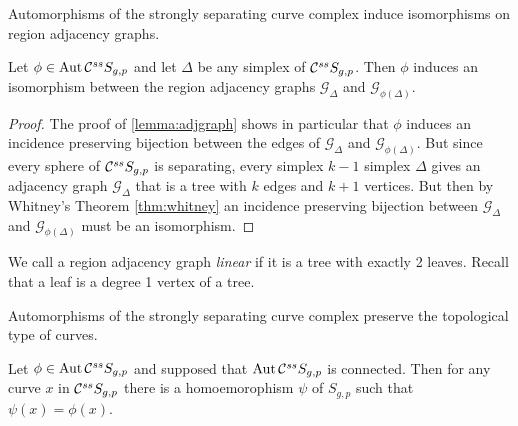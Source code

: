 \begin{lemma}
  \label{thm:cssgraphs}
  Automorphisms of the strongly separating curve complex induce isomorphisms on region adjacency graphs.

  Let $\phi \in \operatorname{Aut}  \mathcal C^{{ss}}  S_{g,p}$ and let $\Delta$ be any simplex of $ \mathcal C^{{ss}}  S_{g,p}$.
  Then $\phi$ induces an isomorphism  between the region adjacency graphs
  $\mathcal G_\Delta$ and $\mathcal G_{\phi(\Delta)}$.
\end{lemma}

\begin{proof}
  The proof of \ref{lemma:adjgraph} shows in particular that $\phi$ induces
  an incidence preserving bijection between the edges of $\mathcal G_\Delta$ and $\mathcal G_{\phi(\Delta)}$.
  But since every sphere of $ \mathcal C^{{ss}}  S_{g,p}$ is separating,
  every simplex $k-1$ simplex $\Delta$ gives an adjacency graph $\mathcal G_\Delta$
  that is a tree with $k$ edges and $k+1$ vertices.
  But then by Whitney's Theorem \ref{thm:whitney}
  an incidence preserving bijection between $\mathcal G_\Delta$ and $\mathcal G_{\phi(\Delta)}$
  must be an isomorphism.
\end{proof}

\begin{definition}
  We call a region adjacency graph \emph{linear} if it is a tree with exactly 2 leaves.
  Recall that a leaf is a degree 1 vertex of a tree.
\end{definition}


\begin{lemma}
  \label{thm:csstype}
  Automorphisms of the strongly separating curve complex preserve the topological type of curves.

  Let $\phi \in \operatorname{Aut}  \mathcal C^{{ss}}  S_{g,p}$ and supposed that $\operatorname{Aut}  \mathcal C^{{ss}}  S_{g,p}$ is connected.
  Then for any curve $x$ in $ \mathcal C^{{ss}}  S_{g,p}$ there is a homoemorophism $\psi$ of $S_{g,p}$
  such that $\psi(x)=\phi(x)$.
\end{lemma}


